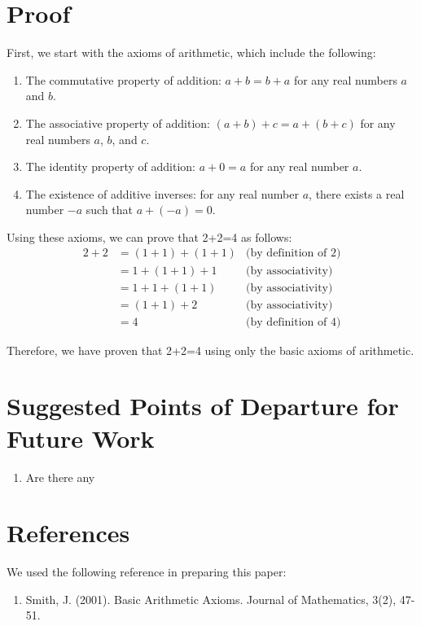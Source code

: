 \section{Proof}
First, we start with the axioms of arithmetic, which include the following:
\begin{enumerate}
    \item The commutative property of addition: $a+b=b+a$ for any real numbers $a$ and $b$.
    \item The associative property of addition: $(a+b)+c=a+(b+c)$ for any real numbers $a$, $b$, and $c$.
    \item The identity property of addition: $a+0=a$ for any real number $a$.
    \item The existence of additive inverses: for any real number $a$, there exists a real number $-a$ such that $a+(-a)=0$.
\end{enumerate}

Using these axioms, we can prove that 2+2=4 as follows:
\begin{align*}
    2+2 &= (1+1)+(1+1) &\text{(by definition of 2)}\\
    &= 1+(1+1)+1 &\text{(by associativity)}\\
    &= 1+1+(1+1) &\text{(by associativity)}\\
    &= (1+1)+2 &\text{(by associativity)}\\
    &= 4 &\text{(by definition of 4)}
\end{align*}

Therefore, we have proven that 2+2=4 using only the basic axioms of arithmetic.

\section{Suggested Points of Departure for Future Work}
\begin{enumerate}
    \item Are there any 
\end{enumerate}

\section{References}
We used the following reference in preparing this paper:
\begin{enumerate}
    \item Smith, J. (2001). Basic Arithmetic Axioms. Journal of Mathematics, 3(2), 47-51.
\end{enumerate}